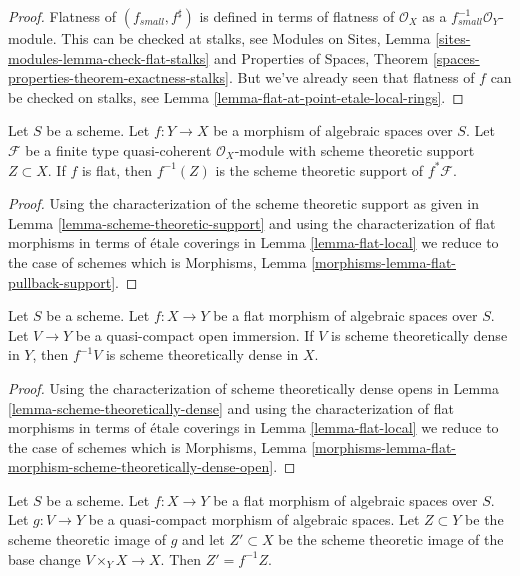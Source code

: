 \begin{proof}
Flatness of $(f_{small}, f^\sharp)$ is defined in terms of
flatness of $\mathcal{O}_X$ as a $f_{small}^{-1}\mathcal{O}_Y$-module.
This can be checked at stalks, see
Modules on Sites, Lemma \ref{sites-modules-lemma-check-flat-stalks}
and
Properties of Spaces, Theorem \ref{spaces-properties-theorem-exactness-stalks}.
But we've already seen that flatness of $f$ can be checked on stalks, see
Lemma \ref{lemma-flat-at-point-etale-local-rings}.
\end{proof}

\begin{lemma}
\label{lemma-flat-pullback-support}
Let $S$ be a scheme. Let $f : Y \to X$ be a morphism of algebraic spaces
over $S$. Let $\mathcal{F}$ be a finite type quasi-coherent
$\mathcal{O}_X$-module with scheme theoretic support $Z \subset X$.
If $f$ is flat, then $f^{-1}(Z)$ is the scheme theoretic support of
$f^*\mathcal{F}$.
\end{lemma}

\begin{proof}
Using the characterization of the scheme theoretic support
as given in Lemma \ref{lemma-scheme-theoretic-support}
and using the characterization of flat morphisms in terms of
\'etale coverings in Lemma \ref{lemma-flat-local}
we reduce to the case of schemes which is
Morphisms, Lemma \ref{morphisms-lemma-flat-pullback-support}.
\end{proof}

\begin{lemma}
\label{lemma-flat-morphism-scheme-theoretically-dense-open}
Let $S$ be a scheme.
Let $f : X \to Y$ be a flat morphism of algebraic spaces over $S$.
Let $V \to Y$ be a quasi-compact open immersion. If $V$
is scheme theoretically dense in $Y$, then $f^{-1}V$
is scheme theoretically dense in $X$.
\end{lemma}

\begin{proof}
Using the characterization of scheme theoretically dense opens
in Lemma \ref{lemma-scheme-theoretically-dense}
and using the characterization of flat morphisms in terms of
\'etale coverings in Lemma \ref{lemma-flat-local}
we reduce to the case of schemes which is
Morphisms, Lemma
\ref{morphisms-lemma-flat-morphism-scheme-theoretically-dense-open}.
\end{proof}

\begin{lemma}
\label{lemma-flat-base-change-scheme-theoretic-image}
Let $S$ be a scheme. Let $f : X \to Y$ be a flat morphism of algebraic spaces
over $S$. Let $g : V \to Y$ be a quasi-compact morphism of algebraic spaces.
Let $Z \subset Y$ be the scheme theoretic image of $g$ and let $Z' \subset X$
be the scheme theoretic image of the base change $V \times_Y X \to X$.
Then $Z' = f^{-1}Z$.
\end{lemma}

